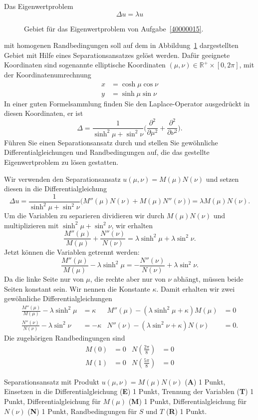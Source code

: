 Das Eigenwertproblem 
\[
\Delta u = \lambda u
\]
\begin{figure}
\centering
{}
\caption{Gebiet für das Eigenwertproblem von Aufgabe~\ref{40000015}.
\label{40000015:gebiet}}
\end{figure}%
mit homogenen Randbedingungen soll auf dem in Abbildung~\ref{40000015:gebiet}
dargestellten Gebiet
mit Hilfe eines Separationsansatzes gelöst werden.
Dafür geeignete Koordinaten sind sogenannte elliptische Koordinaten
$(\mu,\nu)\in \mathbb R^+\times [0,2\pi]$, mit der Koordinatenumrechnung
\begin{align*}
x&=\cosh\mu\cos\nu
\\
y&=\sinh\mu\sin\nu
\end{align*}
In einer guten Formelsammlung finden Sie den Laplace-Operator ausgedrückt
in diesen Koordinaten, er ist
\[
\Delta
=
\frac1{\sinh^2\mu+\sin^2\nu}
\biggl(
\frac{\partial^2}{\partial \mu^2}+\frac{\partial^2}{\partial\nu^2}
\biggr).
\]
Führen Sie einen Separationsansatz durch und stellen Sie gewöhnliche
Differentialgleichungen und Randbedingungen auf, die das gestellte
Eigenwertproblem zu lösen gestatten.

\begin{loesung}
Wir verwenden den Separationsansatz $u(\mu,\nu)=M(\mu)N(\nu)$ und
setzen diesen in die Differentialgleichung
\[
\Delta u
=
\frac1{\sinh^2\mu+\sin^2\nu}
\biggl(
M''(\mu)N(\nu) + M(\mu)N''(\nu)
\biggr)
=
\lambda M(\mu)N(\nu).
\]
Um die Variablen zu separieren dividieren wir durch $M(\mu)N(\nu)$
und multiplizieren mit $\sinh^2\mu+\sin^2\nu$, wir erhalten
\[
\frac{M''(\mu)}{M(\mu)}
+
\frac{N''(\nu)}{N(\nu)}
=
\lambda\sinh^2\mu + \lambda \sin^2\nu.
\]
Jetzt können die Variablen getrennt werden:
\[
\frac{M''(\mu)}{M(\mu)}-\lambda\sinh^2\mu
=
-\frac{N''(\nu)}{N(\nu)}+\lambda\sin^2\nu.
\]
Da die linke Seite nur von $\mu$, die rechte aber nur von $\nu$ abhängt,
müssen beide Seiten konstant sein.
Wir nennen die Konstante $\kappa$.
Damit erhalten wir zwei gewöhnliche Differentialgleichungen
\begin{align*}
\frac{M''(\mu)}{M(\mu)}-\lambda\sinh^2\mu &=  \kappa
&
M''(\mu)-(\lambda\sinh^2\mu+\kappa)M(\mu)&=0
\\
\frac{N''(\nu)}{N(\nu)}-\lambda\sin^2\nu &= -\kappa
&
N''(\nu)-(\lambda\sin^2\nu+\kappa)N(\nu)&=0.
\end{align*}
Die zugehörigen Randbedingungen sind
\begin{align*}
M(0)&=0&
N({\textstyle\frac{2\pi}{8}})&=0
\\
M(1)&=0&
N({\textstyle\frac{5\pi}{8}})&=0
\end{align*}
\end{loesung}

\begin{bewertung}
Separationsansatz mit Produkt $u(\mu,\nu) = M(\mu)N(\nu)$ ({\bf A}) 1 Punkt,
Einsetzen in die Differentialgleichung ({\bf E}) 1 Punkt,
Trennung der Variablen ({\bf T}) 1 Punkt,
Differentialgleichung für $M(\mu)$ ({\bf M}) 1 Punkt,
Differentialgleichung für $N(\nu)$ ({\bf N}) 1 Punkt,
Randbedingungen für $S$ und $T$ ({\bf R}) 1 Punkt.
\end{bewertung}

